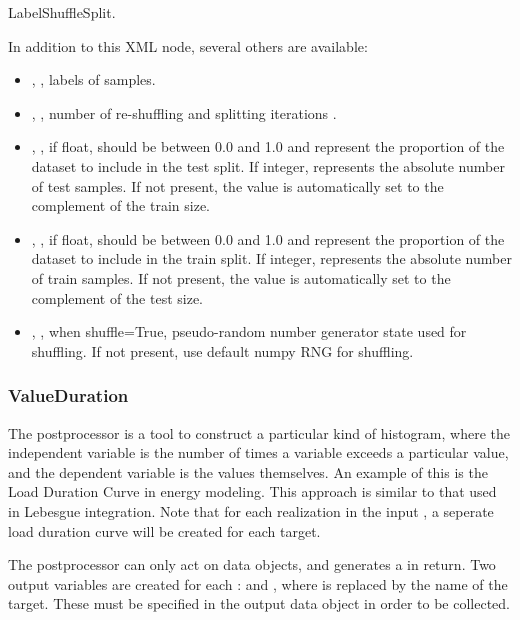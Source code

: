 LabelShuffleSplit.

In addition to this XML node, several others are available:
\begin{itemize}
  \item {}, , labels of samples.
  \item {}, , number of re-shuffling and splitting iterations
    .
  \item {}, , if float, should be between 0.0 and 1.0 and
    represent the proportion of the dataset to include in the test split. 
    If integer, represents the absolute number of test samples. If not present, the value is automatically set to
    the complement of the train size.
  \item {}, , if float, should be between 0.0 and 1.0 and represent
    the proportion of the dataset to include in the train split. If integer, represents the absolute number of train
    samples. If not present, the value is automatically set to the complement of the test size.
  \item {}, , when shuffle=True,
    pseudo-random number generator state used for shuffling. If not present, use default numpy RNG for shuffling.
\end{itemize}

\subsubsection{ValueDuration}
\label{ValueDurationPP}
The  postprocessor is a tool to construct a particular kind of histogram, where the
independent variable is the number of times a variable exceeds a particular value, and the dependent variable
is the values themselves.  An example of this is the Load Duration Curve in energy modeling. This approach is
similar to that used in Lebesgue integration. Note that for each realization in the input
, a seperate load duration curve will be created for each target.

The  postprocessor can only act on  data objects, and generates a
 in return.  Two output variables are created for each :
 and , where  is replaced by the name of the target.
These must be specified in the output data object in order to be collected.

